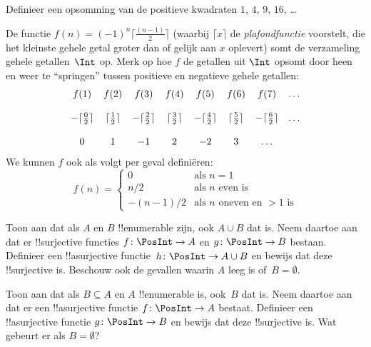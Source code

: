\documentclass[openany]{memoir}
\begin{document}
\begin{prob}
Definieer een opsomming van de positieve kwadraten $1$, $4$, $9$, $16$, \dots
\end{prob}

\begin{ex}
De functie $f(n) = (-1)^{n} \lceil \frac{(n-1)}{2}\rceil$ (waarbij
$\lceil x \rceil$ de \emph{plafondfunctie} voorstelt, die het kleinste
gehele getal groter dan of gelijk aan $x$ oplevert) somt de verzameling
gehele getallen~$\Int$ op. Merk op hoe $f$ de getallen uit $\Int$
opsomt door heen en weer te ``springen'' tussen positieve en
negatieve gehele getallen:
\[
\begin{array}{c c c c c c c c}
f(1) & f(2) & f(3) & f(4) & f(5) & f(6) & f(7) & \dots \\ \\
- \lceil \tfrac{0}{2} \rceil & \lceil \tfrac{1}{2}\rceil & - \lceil \tfrac{2}{2} \rceil & \lceil \tfrac{3}{2} \rceil & - \lceil \tfrac{4}{2} \rceil  & \lceil \tfrac{5}{2}
\rceil & - \lceil \tfrac{6}{2} \rceil & \dots \\ \\
0 & 1 & -1 & 2 & -2 & 3 & \dots
\end{array}
\]
We kunnen $f$ ook als volgt per geval definiëren:
\[
f(n) = \begin{cases}
  0 & \text{als $n = 1$}\\
  n/2 & \text{als $n$ even is}\\
  -(n-1)/2 & \text{als $n$ oneven en $>1$ is}
  \end{cases}
\]
\end{ex}

\begin{prob}
  Toon aan dat als $A$ en $B$ !!{enumerable} zijn, ook $A \cup B$ dat is.
  Neem daartoe aan dat er !!{surjective} functies $f\colon \PosInt \to
  A$ en $g\colon \PosInt \to B$ bestaan. Definieer een !!a{surjective}
  functie~$h\colon \PosInt \to A \cup B$ en bewijs dat deze
  !!{surjective} is. Beschouw ook de gevallen waarin $A$ leeg is
  of~$B = \emptyset$.
\end{prob}
  
\begin{prob}
  Toon aan dat als $B \subseteq A$ en $A$ !!{enumerable} is, ook~$B$
  dat is. Neem daartoe aan dat er een !!a{surjective} functie
  $f\colon \PosInt \to A$ bestaat. Definieer een !!a{surjective} functie
  $g\colon \PosInt \to B$ en bewijs dat deze !!{surjective} is. Wat
  gebeurt er als $B = \emptyset$?
\end{prob}
    
\end{document}
